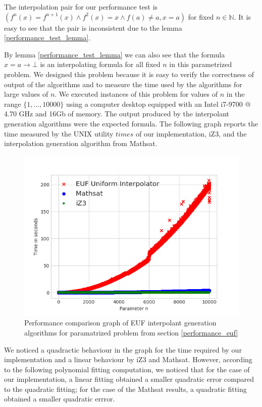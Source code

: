 The interpolation pair for our performance test 
is $(f^n(x) = f^{n+1}(x) \land f^2(x) = x \land f(a) \neq a, x = a)$
for fixed $n \in \mathbb{N}$.
It is easy to see that the pair is inconsistent due to the lemma 
\ref{performance_test_lemma}. 

By lemma \ref{performance_test_lemma}
we can also see that the formula $x = a \rightarrow \bot$ is an 
interpolating formula for all fixed $n$ in this parametrized problem.
We designed this problem because it is easy to verify the 
correctness of output of the algorithms and to measure 
the time used by the algorithms for large values of $n$. 
We executed instances of this problem for values of $n$
in the range $\{1, \dots, 10000\}$ using a computer desktop
equipped with an Intel i7-9700 @ 4.70 GHz and 16Gb of memory. 
The output produced by the interpolant generation algorithms
were the expected formula.
The following graph reports the time measured by the UNIX
utility $times$ of our implementation, iZ3, and the interpolation 
generation algorithm from Mathsat.

\begin{figure}
  \centering
  \includegraphics[scale=0.9]{figures/eufi_performance_graph}
  \caption{Performance comparison graph of EUF interpolant generation
  algorithms for paramatrized problem from section \ref{performance_euf}} 
  \label{performance_graph_euf}
\end{figure}

We noticed a quadractic behaviour in the graph for the time 
required by our implementation
and a linear behaviour by iZ3 and Mathsat. However, 
according to the following polynomial 
fitting computation, 
we noticed that for the case of our implementation, 
a linear fitting obtained a smaller 
quadratic error compared to the quadratic fitting;  
for the case of the Mathsat
results, a quadratic fitting obtained a smaller 
quadratic errror.

